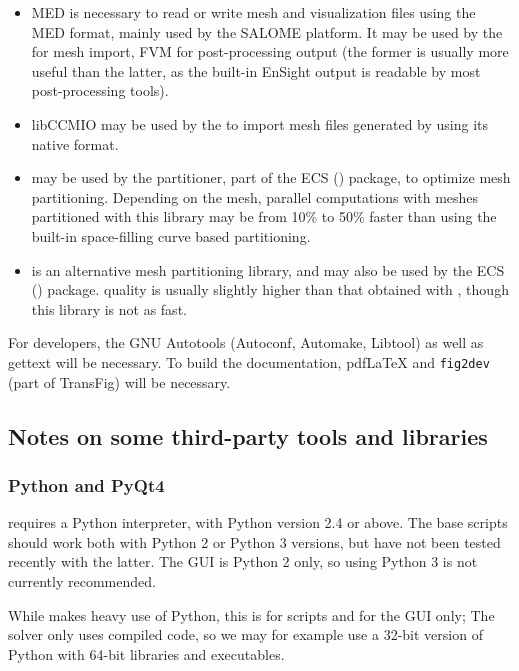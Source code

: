 \documentclass[a4paper,10pt,twoside]{article}
\begin{document}
\begin{itemize}
\item MED is necessary to read or write mesh and visualization files
      using the MED format, mainly used by the SALOME platform.
      It may be used by the \pcs for mesh import, FVM for
      post-processing output (the former is usually more useful than
      the latter, as the built-in EnSight output is readable by most
      post-processing tools).

\item libCCMIO may be used by the \pcs to import mesh files generated by
      \starccmp using its native format.

\item \metis  may be used by the partitioner, part of the ECS (\pcs)
      package, to optimize mesh partitioning.
      Depending on the mesh, parallel computations with meshes partitioned
      with this library may be from 10\% to 50\% faster than using the
      built-in space-filling curve based partitioning.

\item \scotch is an alternative mesh partitioning library, and may also
      be used by the ECS (\pcs) package.
      quality is usually slightly higher than that obtained with \metis,
      though this library is not as fast.

\end{itemize}

For developers, the GNU Autotools (Autoconf, Automake, Libtool) as
well as gettext will be necessary. To build the documentation,
pdf\LaTeX{} and \texttt{fig2dev} (part of TransFig) will be necessary.

\subsection{Notes on some third-party tools and libraries}

\subsubsection{Python and PyQt4\label{sec:ext:python}}

\CS requires a Python interpreter, with Python version 2.4 or above.
The base scripts should work both with Python 2 or Python 3 versions,
but have not been tested recently with the latter. The GUI is Python 2
only, so using Python 3 is not currently recommended.

While \CS makes heavy use of Python, this is for scripts and for the GUI only;
The solver only uses compiled code, so we may for example use
a 32-bit version of Python with 64-bit \CS libraries and executables.
\end{document}
